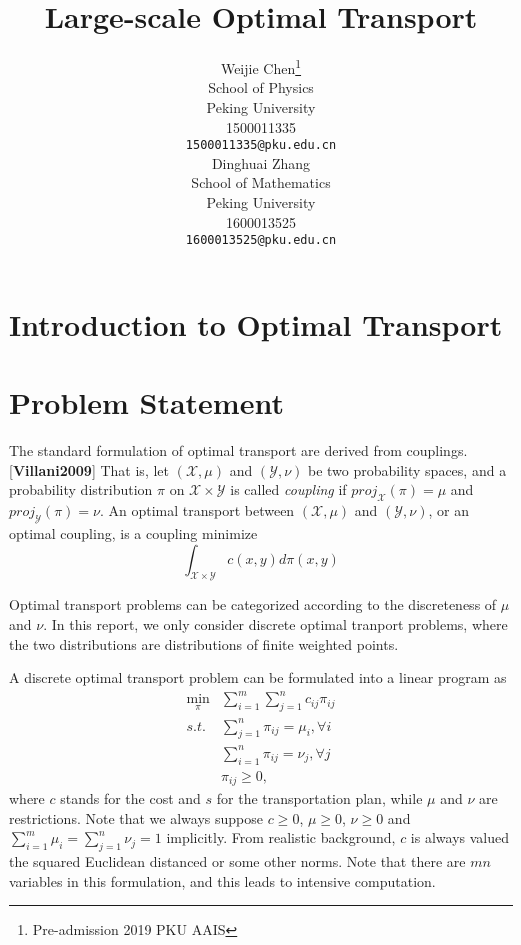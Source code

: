 \documentclass{article}
\title{Large-scale Optimal Transport}
\author{
  Weijie Chen\thanks{Pre-admission 2019 PKU AAIS} \\
  School of Physics\\
  Peking University\\
  1500011335 \\
  \texttt{1500011335@pku.edu.cn} \\
  \And
  Dinghuai Zhang \\
  School of Mathematics\\
  Peking University\\
  1600013525\\
  \texttt{1600013525@pku.edu.cn} \\
}
\begin{document}

\maketitle

\begin{abstract}
  
\end{abstract}

\section{Introduction to Optimal Transport}

\section{Problem Statement}
The standard formulation of optimal transport are derived from couplings. [\textbf{Villani2009}] That is, let $ \left(\mathcal{X}, \mu \right)$ and $\left(\mathcal{Y}, \nu \right)$  be two probability spaces, and a probability distribution $\pi$ on $ \mathcal{X} \times \mathcal{Y} $ is called \emph{coupling} if $ proj_{\mathcal{X}} (\pi) = \mu $ and $ proj_{\mathcal{Y}} (\pi)= \nu $. An optimal transport between $ \left(\mathcal{X}, \mu \right)  $ and $ \left(\mathcal{Y}, \nu \right) $, or an optimal coupling, is a coupling minimize
\begin{equation}
\int_{ \mathcal{X} \times \mathcal{Y} } c ( x, y)  d \pi ( x, y ) 
\end{equation}

Optimal transport problems can be categorized according to the discreteness of $\mu$ and $\nu$. In this report, we only consider discrete optimal tranport problems, where the two distributions are distributions of finite weighted points.

A discrete optimal transport problem can be formulated into a linear program as
\begin{equation} \label{Eq:StdLP}
\begin{aligned}
\min_{\pi} & \sum_{i=1}^{m}\sum_{j=1}^{n} c_{ i j } \pi_{ i j }\\
s.t. & \sum_{j=1}^{n}\pi_{ i j } = \mu_i, \forall i\\
& \sum_{i=1}^{n}\pi_{ i j } = \nu_j, \forall j \\
& \pi_{ij} \geq 0,
\end{aligned}
\end{equation}
where $c$ stands for the cost and $s$ for the transportation plan, while $\mu$ and $\nu$ are restrictions. Note that we always suppose $ c \geq 0 $, $ \mu \geq 0 $, $ \nu \geq 0 $ and $ \sum_{i=1}^{m}{\mu_i} = \sum_{j=1}^{n}{\nu_j} = 1 $ implicitly. From realistic background, $c$ is always valued the squared Euclidean distanced or some other norms. Note that there are $ m n $ variables in this formulation, and this leads to intensive computation.
\end{document}
